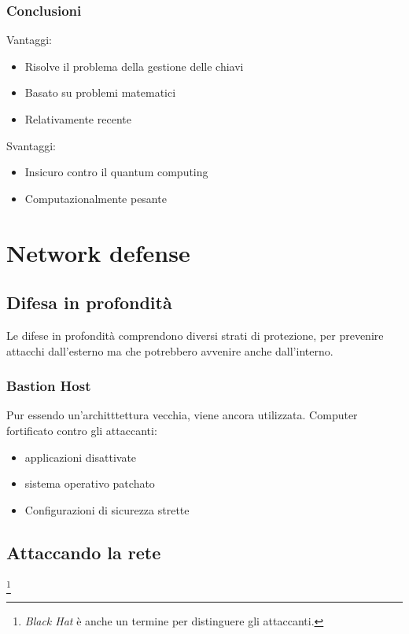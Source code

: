 \subsubsection{Conclusioni}

Vantaggi:
\begin{itemize}
\item Risolve il problema della gestione delle chiavi
\item Basato su problemi matematici
\item Relativamente recente
\end{itemize}

Svantaggi:
\begin{itemize}
\item Insicuro contro il quantum computing
\item Computazionalmente pesante
\end{itemize}


\section{Network defense}

\subsection{Difesa in profondità}

Le difese in profondità comprendono diversi strati di protezione, per prevenire 
attacchi dall'esterno ma che potrebbero avvenire anche dall'interno.

\subsubsection{Bastion Host}

Pur essendo un'architttettura vecchia, viene ancora utilizzata.
Computer fortificato contro gli attaccanti:
\begin{itemize}
\item applicazioni disattivate
\item sistema operativo patchato
\item Configurazioni di sicurezza strette
\end{itemize}

\subsection{Attaccando la rete}\footnote{\textit{Black Hat} è anche un termine 
per distinguere gli attaccanti.}

